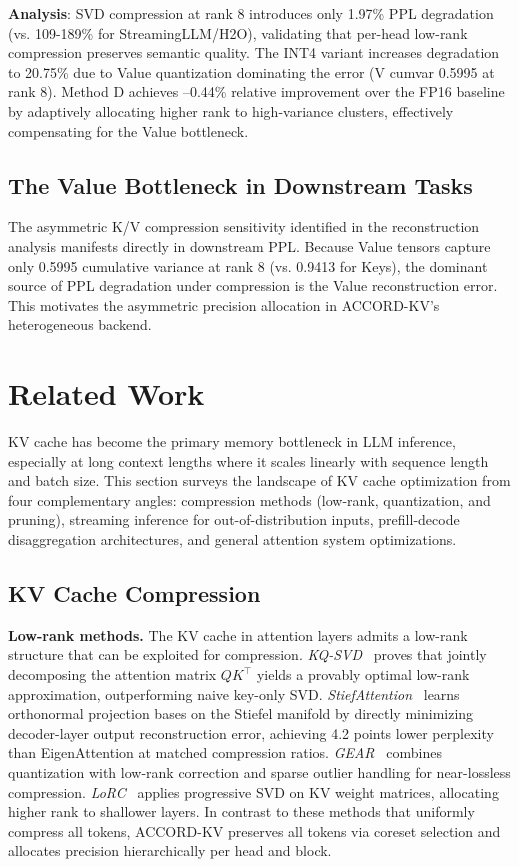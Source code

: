 \documentclass[11pt, a4paper, oneside]{article}
\theoremstyle{myplain}
\theoremstyle{mydefinition}
\theoremstyle{myremark}
\begin{document}
\textbf{Analysis}: SVD compression at rank 8 introduces only 1.97\% PPL degradation (vs. 109-189\% for StreamingLLM/H2O), validating that per-head low-rank compression preserves semantic quality. The INT4 variant increases degradation to 20.75\% due to Value quantization dominating the error (V cumvar 0.5995 at rank 8). Method D achieves --0.44\% relative improvement over the FP16 baseline by adaptively allocating higher rank to high-variance clusters, effectively compensating for the Value bottleneck.

\subsection{The Value Bottleneck in Downstream Tasks}
\label{sec:kvasym}

The asymmetric K/V compression sensitivity identified in the reconstruction analysis manifests directly in downstream PPL. Because Value tensors capture only 0.5995 cumulative variance at rank 8 (vs. 0.9413 for Keys), the dominant source of PPL degradation under compression is the Value reconstruction error. This motivates the asymmetric precision allocation in ACCORD-KV's heterogeneous backend.

\section{Related Work}
\label{sec:related}

KV cache has become the primary memory bottleneck in LLM inference, especially at long context lengths where it scales linearly with sequence length and batch size. This section surveys the landscape of KV cache optimization from four complementary angles: compression methods (low-rank, quantization, and pruning), streaming inference for out-of-distribution inputs, prefill-decode disaggregation architectures, and general attention system optimizations.

\subsection{KV Cache Compression}

\textbf{Low-rank methods.} The KV cache in attention layers admits a low-rank structure that can be exploited for compression. \textit{KQ-SVD}~\cite{lesens2025kqsvd} proves that jointly decomposing the attention matrix $QK^\top$ yields a provably optimal low-rank approximation, outperforming naive key-only SVD. \textit{StiefAttention}~\cite{cao2026stiefattention} learns orthonormal projection bases on the Stiefel manifold by directly minimizing decoder-layer output reconstruction error, achieving 4.2 points lower perplexity than EigenAttention at matched compression ratios. \textit{GEAR}~\cite{kang2024gear} combines quantization with low-rank correction and sparse outlier handling for near-lossless compression. \textit{LoRC}~\cite{zhang2024lorc} applies progressive SVD on KV weight matrices, allocating higher rank to shallower layers. In contrast to these methods that uniformly compress all tokens, ACCORD-KV preserves all tokens via coreset selection and allocates precision hierarchically per head and block.
\end{document}
